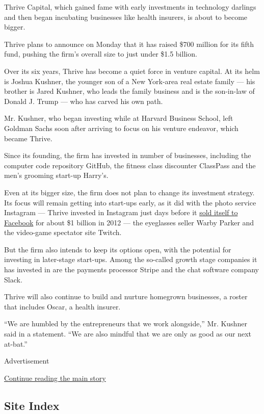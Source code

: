 Thrive Capital, which gained fame with early investments in technology
darlings and then began incubating businesses like health insurers, is
about to become bigger.

Thrive plans to announce on Monday that it has raised \$700 million for
its fifth fund, pushing the firm's overall size to just under \$1.5
billion.

Over its six years, Thrive has become a quiet force in venture capital.
At its helm is Joshua Kushner, the younger son of a New York-area real
estate family --- his brother is Jared Kushner, who leads the family
business and is the son-in-law of Donald J. Trump --- who has carved his
own path.

Mr. Kushner, who began investing while at Harvard Business School, left
Goldman Sachs soon after arriving to focus on his venture endeavor,
which became Thrive.

Since its founding, the firm has invested in number of businesses,
including the computer code repository GitHub, the fitness class
discounter ClassPass and the men's grooming start-up Harry's.

Even at its bigger size, the firm does not plan to change its investment
strategy. Its focus will remain getting into start-ups early, as it did
with the photo service Instagram --- Thrive invested in Instagram just
days before it
\href{http://dealbook.nytimes.com/2012/04/09/facebook-buys-instagram-for-1-billion/}{sold
itself to Facebook} for about \$1 billion in 2012 --- the eyeglasses
seller Warby Parker and the video-game spectator site Twitch.

But the firm also intends to keep its options open, with the potential
for investing in later-stage start-ups. Among the so-called growth stage
companies it has invested in are the payments processor Stripe and the
chat software company Slack.

Thrive will also continue to build and nurture homegrown businesses, a
roster that includes Oscar, a health insurer.

``We are humbled by the entrepreneurs that we work alongside,'' Mr.
Kushner said in a statement. ``We are also mindful that we are only as
good as our next at-bat.''

Advertisement

\protect\hyperlink{after-bottom}{Continue reading the main story}

\hypertarget{site-index}{%
\subsection{Site Index}\label{site-index}}

